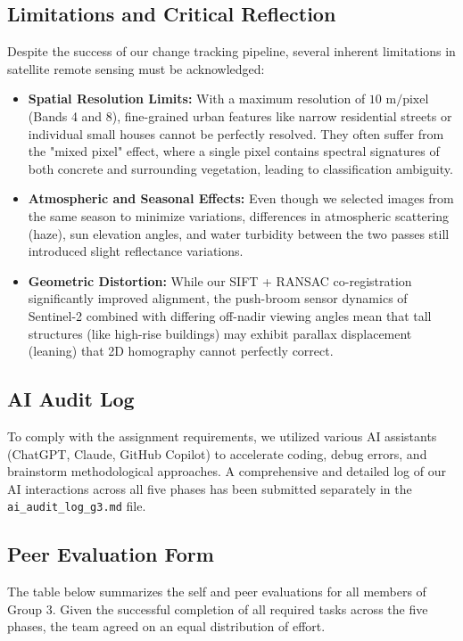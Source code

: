 \documentclass[12pt,a4paper]{article}
\begin{document}
\subsection{Limitations and Critical Reflection}
Despite the success of our change tracking pipeline, several inherent limitations in satellite remote sensing must be acknowledged:
\begin{itemize}
    \item \textbf{Spatial Resolution Limits:} With a maximum resolution of $10\text{ m/pixel}$ (Bands 4 and 8), fine-grained urban features like narrow residential streets or individual small houses cannot be perfectly resolved. They often suffer from the "mixed pixel" effect, where a single pixel contains spectral signatures of both concrete and surrounding vegetation, leading to classification ambiguity.
    \item \textbf{Atmospheric and Seasonal Effects:} Even though we selected images from the same season to minimize variations, differences in atmospheric scattering (haze), sun elevation angles, and water turbidity between the two passes still introduced slight reflectance variations.
    \item \textbf{Geometric Distortion:} While our SIFT + RANSAC co-registration significantly improved alignment, the push-broom sensor dynamics of Sentinel-2 combined with differing off-nadir viewing angles mean that tall structures (like high-rise buildings) may exhibit parallax displacement (leaning) that 2D homography cannot perfectly correct.
\end{itemize}

\subsection{AI Audit Log}
To comply with the assignment requirements, we utilized various AI assistants (ChatGPT, Claude, GitHub Copilot) to accelerate coding, debug errors, and brainstorm methodological approaches. A comprehensive and detailed log of our AI interactions across all five phases has been submitted separately in the \texttt{ai\_audit\_log\_g3.md} file.

\subsection{Peer Evaluation Form}
The table below summarizes the self and peer evaluations for all members of Group 3. Given the successful completion of all required tasks across the five phases, the team agreed on an equal distribution of effort.
\end{document}
